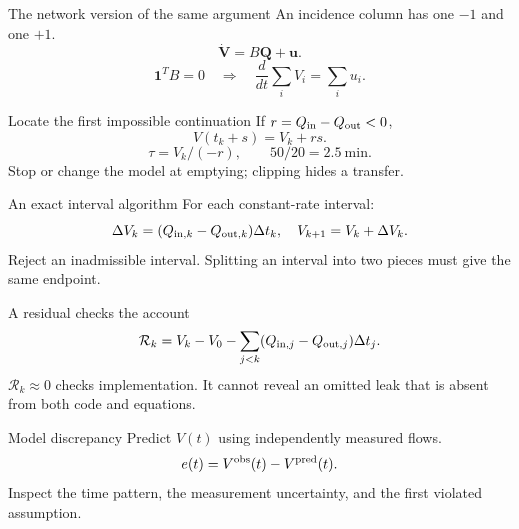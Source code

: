 \documentclass[aspectratio=169,11pt]{beamer}
\newcommand{\notestarget}{notes.pdf}\newcommand{\noteslabel}{Notes}
\begin{document}
\begin{frame}[t,fragile,label=slide-the-network-version-of-the-same-argument]{The network version of the same argument}
An incidence column has one $-1$ and one $+1$.\[\dot{\mathbf V}=B\mathbf Q+\mathbf u.\]\pause{}\[\mathbf1^TB=0\quad\Rightarrow\quad\frac{d}{dt}\sum_iV_i=\sum_i u_i.\]
\end{frame}
\renewcommand{\notestarget}{notes.pdf\#note-admissibility-and-the-emptying-event}
\begin{frame}[t,fragile,label=slide-locate-the-first-impossible-continuation]{Locate the first impossible continuation}
If $r=Q_{\rm in}-Q_{\rm out}<0$,\[V(t_k+s)=V_k+rs.\]\pause{}\[\tau=V_k/(-r),\qquad50/20=2.5\ \mathrm{min}.\]Stop or change the model at emptying; clipping hides a transfer.
\end{frame}
\renewcommand{\notestarget}{notes.pdf\#note-exact-interval-updates-and-evidence-for-the-model}
\begin{frame}[t,fragile,label=slide-an-exact-interval-algorithm]{An exact interval algorithm}
For each constant-rate interval:\[\Delta V_k=(Q_{{\rm in},k}-Q_{{\rm out},k})\Delta t_k,\quad V_{k+1}=V_k+\Delta V_k.\]\pause{} Reject an inadmissible interval. Splitting an interval into two pieces must give the same endpoint.
\end{frame}
\renewcommand{\notestarget}{notes.pdf\#note-exact-interval-updates-and-evidence-for-the-model}
\begin{frame}[t,fragile,label=slide-a-residual-checks-the-account]{A residual checks the account}
\[\mathcal R_k=V_k-V_0-\sum_{j<k}(Q_{{\rm in},j}-Q_{{\rm out},j})\Delta t_j.\]\pause{} $\mathcal R_k\approx0$ checks implementation. It cannot reveal an omitted leak that is absent from both code and equations.
\end{frame}
\renewcommand{\notestarget}{notes.pdf\#note-exact-interval-updates-and-evidence-for-the-model}
\begin{frame}[t,fragile,label=slide-model-discrepancy]{Model discrepancy}
Predict $V(t)$ using independently measured flows.\pause{}\[e(t)=V^{\rm obs}(t)-V^{\rm pred}(t).\]Inspect the time pattern, the measurement uncertainty, and the first violated assumption.
\end{frame}
\end{document}
